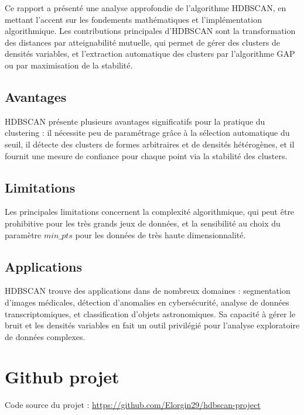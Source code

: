 \documentclass[11pt,a4paper]{article}
\begin{document}
Ce rapport a présenté une analyse approfondie de l'algorithme HDBSCAN, en mettant l'accent sur les fondements mathématiques et l'implémentation algorithmique. Les contributions principales d'HDBSCAN sont la transformation des distances par atteignabilité mutuelle, qui permet de gérer des clusters de densités variables, et l'extraction automatique des clusters par l'algorithme GAP ou par maximisation de la stabilité.

\subsection*{Avantages}

HDBSCAN présente plusieurs avantages significatifs pour la pratique du clustering : il nécessite peu de paramétrage grâce à la sélection automatique du seuil, il détecte des clusters de formes arbitraires et de densités hétérogènes, et il fournit une mesure de confiance pour chaque point via la stabilité des clusters.

\subsection*{Limitations}

Les principales limitations concernent la complexité algorithmique, qui peut être prohibitive pour les très grands jeux de données, et la sensibilité au choix du paramètre $min\_pts$ pour les données de très haute dimensionnalité.

\subsection*{Applications}

HDBSCAN trouve des applications dans de nombreux domaines : segmentation d'images médicales, détection d'anomalies en cybersécurité, analyse de données transcriptomiques, et classification d'objets astronomiques. Sa capacité à gérer le bruit et les densités variables en fait un outil privilégié pour l'analyse exploratoire de données complexes.

\section*{Github projet}

Code source du projet : \url{https://github.com/Elorgin29/hdbscan-project}

\nocite{*}


\end{document}
